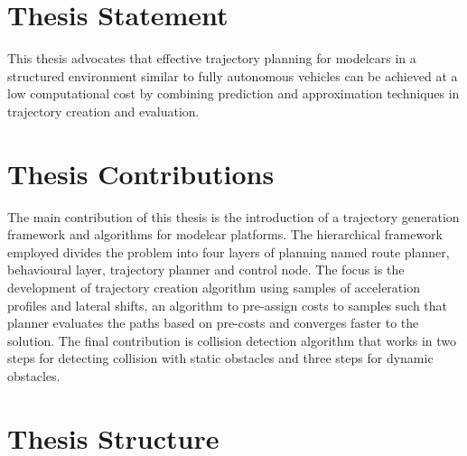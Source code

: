 

\section{Thesis Statement}

This thesis advocates that effective trajectory planning for modelcars in a structured environment similar to fully autonomous vehicles can be achieved at a low computational cost by combining prediction and approximation techniques in trajectory creation and evaluation.

\section{Thesis Contributions}

The main contribution of this thesis is the introduction of a trajectory generation framework and algorithms for modelcar platforms. The hierarchical framework employed divides the problem into four layers of planning named route planner, behavioural layer, trajectory planner and control node. The focus is the development of trajectory creation algorithm using samples of acceleration profiles and lateral shifts, an algorithm to pre-assign costs to samples such that planner evaluates the paths based on pre-costs and converges faster to the solution. The final contribution is collision detection algorithm that works in two steps for detecting collision with static obstacles and three steps for dynamic obstacles. 

\section{Thesis Structure}


